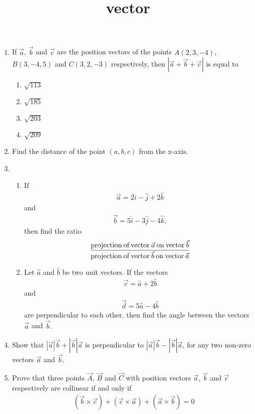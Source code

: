 \documentclass{article}
\title{vector}
\begin{document}
\begin{enumerate}
	\item If $\vec{a}$, $\vec{b}$ and $\vec{c}$ are the position vectors of the points $A(2,3,-4)$, $B(3,-4,5)$ and $C(3,2,-3)$ respectively, then $|\vec{a} + \vec{b} + \vec{c}|$ is equal to
\begin{enumerate}[label=(\Alph*)]
\item $\sqrt{113}$
\item $\sqrt{185}$
\item $\sqrt{203}$
\item $\sqrt{209}$
\end{enumerate}
\item Find the distance of the point $(a, b, c)$ from the x-axis.
\item \begin{enumerate} %
		\item If 
			\begin{align}
				\vec{a}= 2\hat{i} - \hat{j} + 2\hat{k}
			\end{align}
			and
			\begin{align}
				\vec{b} = 5\hat{i} - 3\hat{j} - 4\hat{k},
			\end{align}
			then find the ratio
			\begin{align}
				\frac{\text{projection\:of\:vector}\:\vec{a}\: \text{on\:vector} \:\vec{b}}{\text{projection\:of\:vector}\:\vec{b}\: \text{on\:vector}\:\vec{a}}
			\end{align}
\item Let $\hat{a}$ and $\hat{b}$ be two unit vectors. If the vectors 
	\begin{align}	
		\vec{c} = \hat{a} + 2\hat{b}
	\end{align}
		and 
		\begin{align}
			\vec{d} = 5\hat{a} - 4\hat{b} 
		\end{align}
		are perpendicular to each other, then find the angle between the vectors $\vec{a}$ and $\vec{b}.$ 
\end{enumerate}
\item Show that $|\vec{a}|\vec{b} +|\vec{b}|\vec{a}$ is perpendicular to $|\vec{a} |\vec{b} - |\vec{b}|\vec{a}$, for any two non-zero vectors $\vec{a}$ and $\vec{b}.$
\item Prove that three points $\vec{A}$, $\vec{B}$ and $\vec{C}$ with position vectors $\vec{a}$, $\vec{b}$ and $\vec{c}$ respectively are collinear if and only if 
	\begin{align}
		(\vec{b} \times \vec{c}) + (\vec{c} \times \vec{a}) + (\vec{a} \times \vec{b}) = 0
	\end{align}
\end{enumerate}
\end{document}

